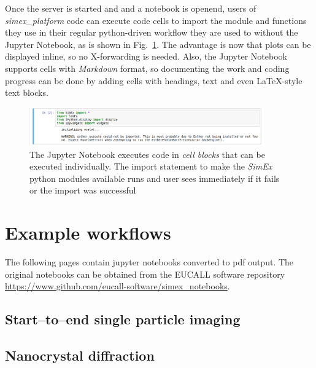 \documentclass[10pt]{scrartcl}
\begin{document}
%
Once the server is started and and a notebook is openend, users of
\textit{simex\_platform} code can execute code cells
to import the module and functions they use in their regular python-driven workflow they are used to without the Jupyter Notebook, as is shown in Fig.~\ref{fig:simex_import}.
The advantage is now that plots can be displayed inline, so no X-forwarding is needed.
Also, the Jupyter Notebook supports cells with \textit{Markdown} format, so documenting the work and coding progress can be done by adding cells with headings, text and even \LaTeX -style text blocks.
%
\begin{figure}
 \centering
 \includegraphics[width=0.9\textwidth]{figures/simex_import_jhub.png}
 \caption{The Jupyter Notebook executes code in \textit{cell blocks} that can be
 executed individually. The import statement to make the \textit{SimEx} python modules available runs and user sees immediately if it fails or the import was successful}
 \label{fig:simex_import}
\end{figure}
%
\FloatBarrier
\printbibliography[title={References}]
%
%
%
%
\FloatBarrier
\appendix
\section{Example workflows}
\label{appendix:notebooks}
The following pages contain jupyter notebooks converted to pdf output. The
original notebooks can be
obtained from the EUCALL software repository
\url{https://www.github.com/eucall-software/simex_notebooks}.
\subsection{Start--to--end single particle imaging}

%
\subsection{Nanocrystal diffraction}

%
\end{document}

